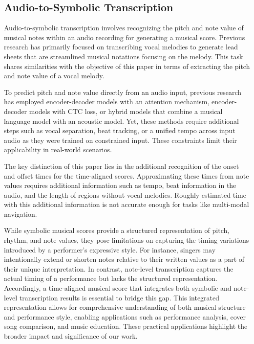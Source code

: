 \subsection{Audio-to-Symbolic Transcription}
Audio-to-symbolic transcription involves recognizing the pitch and note value of musical notes within an audio recording for generating a musical score.
Previous research \cite{weakly_attention, beat_attention, CRNN_HSMM, ctc_score1, ctc_score2} has primarily focused on transcribing vocal melodies to generate lead sheets that are streamlined musical notations focusing on the melody. This task shares similarities with the objective of this paper in terms of extracting the pitch and note value of a vocal melody.

To predict pitch and note value directly from an audio input, previous research has employed encoder-decoder models with an attention mechanism\cite{weakly_attention, beat_attention}, encoder-decoder models with CTC loss\cite{ctc_score1, ctc_score2}, or hybrid models that combine a musical language model with an acoustic model\cite{CRNN_HSMM}. Yet, these methods require additional steps such as vocal separation\cite{ctc_score1, ctc_score2}, beat tracking\cite{weakly_attention, beat_attention, CRNN_HSMM}, or a unified tempo across input audio\cite{weakly_attention} as they were trained on constrained input. These constraints limit their applicability in real-world scenarios.

The key distinction of this paper lies in the additional recognition of the onset and offset times for the time-aligned scores. Approximating these times from note values requires additional information such as tempo, beat information in the audio, and the length of regions without vocal melodies. Roughly estimated time with this additional information is not accurate enough for tasks like multi-modal navigation. 

While symbolic musical scores provide a structured representation of pitch, rhythm, and note values, they pose limitations on capturing the timing variations introduced by a performer's expressive style. For instance, singers may intentionally extend or shorten notes relative to their written values as a part of their unique interpretation. In contrast, note-level transcription captures the actual timing of a performance but lacks the structured representation. Accordingly, a time-aligned musical score that integrates both symbolic and note-level transcription results is essential to bridge this gap.
This integrated representation allows for comprehensive understanding of both musical structure and performance style, enabling applications such as performance analysis, cover song comparison, and music education. These practical applications highlight the broader impact and significance of our work. 

